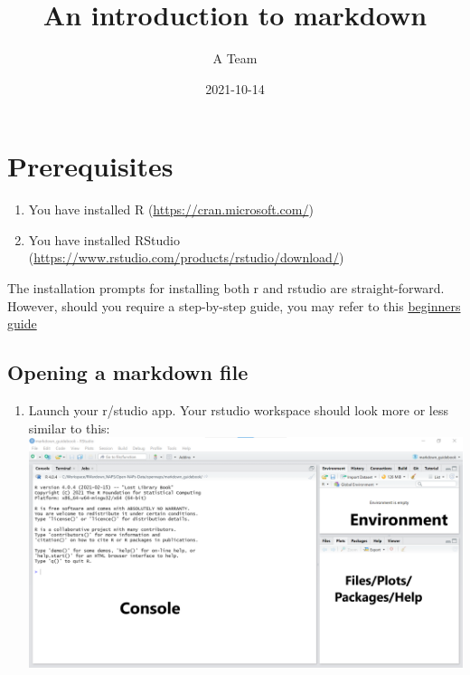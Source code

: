 \documentclass[
]{book}
\title{An introduction to markdown}
\author{A Team}
\date{2021-10-14}
\providecommand{\tightlist}{%
  \setlength{\itemsep}{0pt}\setlength{\parskip}{0pt}}
\begin{document}
\maketitle

{
\setcounter{tocdepth}{1}
\tableofcontents
}
\hypertarget{prerequisites}{%
\chapter{Prerequisites}\label{prerequisites}}

\begin{enumerate}
\def\labelenumi{\arabic{enumi}.}
\tightlist
\item
  You have installed R (\url{https://cran.microsoft.com/})
\item
  You have installed RStudio (\url{https://www.rstudio.com/products/rstudio/download/})
\end{enumerate}

The installation prompts for installing both r and rstudio are straight-forward.
However, should you require a step-by-step guide, you may refer to this \href{https://techvidvan.com/tutorials/install-r/}{beginners guide}

\hypertarget{opening-a-markdown-file}{%
\section{Opening a markdown file}\label{opening-a-markdown-file}}

\begin{enumerate}
\def\labelenumi{\arabic{enumi}.}
\tightlist
\item
  Launch your r/studio app.
  Your rstudio workspace should look more or less similar to this: \includegraphics{tutorial_screenshots/rstudio_panels.png}
\end{enumerate}
\end{document}
